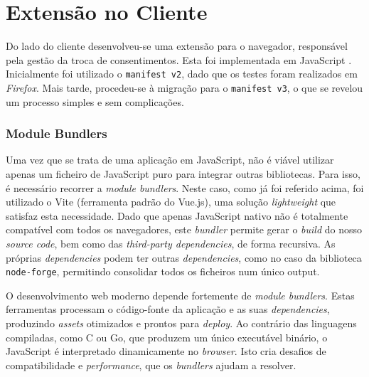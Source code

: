 \section{Extensão no Cliente}
Do lado do cliente desenvolveu-se uma extensão para o navegador, responsável pela gestão da troca de consentimentos. Esta foi implementada em JavaScript \citep{MozillaBrowserExtensions}. Inicialmente foi utilizado o \texttt{manifest v2}, dado que os testes foram realizados em \textit{Firefox}. Mais tarde, procedeu-se à migração para o \texttt{manifest v3}, o que se revelou um processo simples e sem complicações.


\subsubsection{Module Bundlers}

Uma vez que se trata de uma aplicação em JavaScript, não é viável utilizar apenas um ficheiro de JavaScript puro para integrar outras bibliotecas. Para isso, é necessário recorrer a \textit{module bundlers}. Neste caso, como já foi referido acima, foi utilizado o Vite (ferramenta padrão do Vue.js), uma solução \textit{lightweight} que satisfaz esta necessidade. Dado que apenas JavaScript nativo não é totalmente compatível com todos os navegadores, este \textit{bundler} permite gerar o \textit{build} do nosso \textit{source code}, bem como das \textit{third-party dependencies}, de forma recursiva. As próprias \textit{dependencies} podem ter outras \textit{dependencies}, como no caso da biblioteca \texttt{node-forge}, permitindo consolidar todos os ficheiros num único output.

O desenvolvimento web moderno depende fortemente de \textit{module bundlers}. Estas ferramentas processam o código-fonte da aplicação e as suas \textit{dependencies}, produzindo \textit{assets} otimizados e prontos para \textit{deploy}. Ao contrário das linguagens compiladas, como C ou Go, que produzem um único executável binário, o JavaScript é interpretado dinamicamente no \textit{browser}. Isto cria desafios de compatibilidade e \textit{performance}, que os \textit{bundlers} ajudam a resolver.

